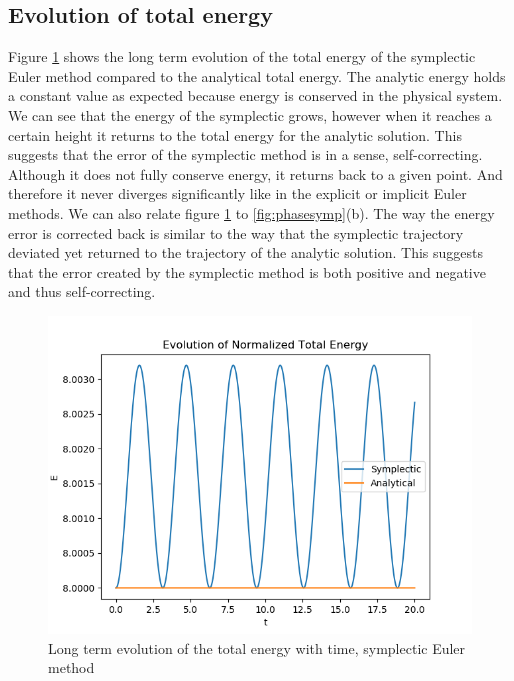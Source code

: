 \documentclass{article}
\begin{document}
\subsection{Evolution of total energy}
Figure \ref{fig:totalenergysym} shows the long term evolution of the total energy of the symplectic Euler method compared to the analytical total energy. The analytic energy holds a constant value as expected because energy is conserved in the physical system. We can see that the energy of the symplectic grows, however when it reaches a certain height it returns to the total energy for the analytic solution. This suggests that the error of the symplectic method is in a sense, self-correcting. Although it does not fully conserve energy, it returns back to a given point. And therefore it never diverges significantly like in the explicit or implicit Euler methods. We can also relate figure \ref{fig:totalenergysym} to \ref{fig:phasesymp}(b). The way the energy error is corrected back is similar to the way that the symplectic trajectory deviated yet returned to the trajectory of the analytic solution. This suggests that the error created by the symplectic method is both positive and negative and thus self-correcting. 
\begin{figure}[h]
    \centering
    \includegraphics[width = \textwidth]{Images/totalenenergysym.png}
    \caption{Long term evolution of the total energy with time, symplectic Euler method}
    \label{fig:totalenergysym}
\end{figure}
\end{document}
